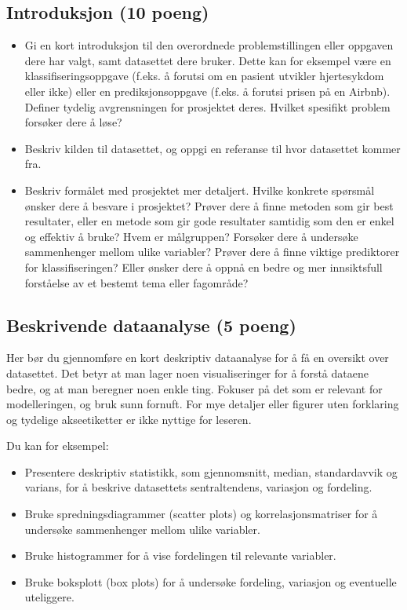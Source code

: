 \documentclass[]{article}
\providecommand{\tightlist}{%
  \setlength{\itemsep}{0pt}\setlength{\parskip}{0pt}}
\begin{document}
\subsection{Introduksjon (10 poeng)}\label{introduksjon-10-poeng}

\begin{itemize}
\item
  Gi en kort introduksjon til den overordnede problemstillingen eller
  oppgaven dere har valgt, samt datasettet dere bruker. Dette kan for
  eksempel være en klassifiseringsoppgave (f.eks. å forutsi om en
  pasient utvikler hjertesykdom eller ikke) eller en prediksjonsoppgave
  (f.eks. å forutsi prisen på en Airbnb). Definer tydelig avgrensningen
  for prosjektet deres. Hvilket spesifikt problem forsøker dere å løse?
\item
  Beskriv kilden til datasettet, og oppgi en referanse til hvor
  datasettet kommer fra.
\item
  Beskriv formålet med prosjektet mer detaljert. Hvilke konkrete
  spørsmål ønsker dere å besvare i prosjektet? Prøver dere å finne
  metoden som gir best resultater, eller en metode som gir gode
  resultater samtidig som den er enkel og effektiv å bruke? Hvem er
  målgruppen? Forsøker dere å undersøke sammenhenger mellom ulike
  variabler? Prøver dere å finne viktige prediktorer for
  klassifiseringen? Eller ønsker dere å oppnå en bedre og mer
  innsiktsfull forståelse av et bestemt tema eller fagområde?
\end{itemize}

\subsection{Beskrivende dataanalyse (5
poeng)}\label{beskrivende-dataanalyse-5-poeng}

Her bør du gjennomføre en kort deskriptiv dataanalyse for å få en
oversikt over datasettet. Det betyr at man lager noen visualiseringer
for å forstå dataene bedre, og at man beregner noen enkle ting. Fokuser
på det som er relevant for modelleringen, og bruk sunn fornuft. For mye
detaljer eller figurer uten forklaring og tydelige akseetiketter er ikke
nyttige for leseren.

Du kan for eksempel:

\begin{itemize}
\tightlist
\item
  Presentere deskriptiv statistikk, som gjennomsnitt, median,
  standardavvik og varians, for å beskrive datasettets sentraltendens,
  variasjon og fordeling.
\item
  Bruke spredningsdiagrammer (scatter plots) og korrelasjonsmatriser for
  å undersøke sammenhenger mellom ulike variabler.
\item
  Bruke histogrammer for å vise fordelingen til relevante variabler.
\item
  Bruke boksplott (box plots) for å undersøke fordeling, variasjon og
  eventuelle uteliggere.
\end{itemize}
\end{document}
